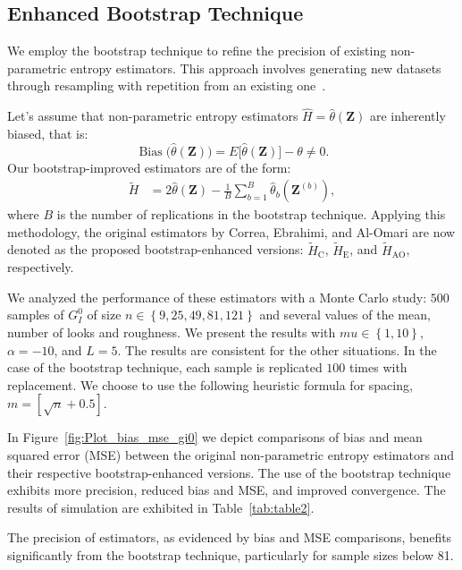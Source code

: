 \documentclass[remotesensing,article,submit,moreauthors,pdftex]{Definitions/mdpi}
\begin{document}
\hypertarget{enhanced-bootstrap-technique}{%
\subsection{Enhanced Bootstrap
Technique}\label{enhanced-bootstrap-technique}}

We employ the bootstrap technique to refine the precision of existing
non-parametric entropy estimators. This approach involves generating new
datasets through resampling with repetition from an existing
one~\cite{Michelucci2021}.

Let's assume that non-parametric entropy estimators
\(\widehat{H}=\widehat{\theta}(\bm{Z})\) are inherently biased, that is:
\begin{equation}
\label{Eq:bias1}
\operatorname{Bias}\big(\widehat{\theta}(\bm{Z})\big) = E\big[\widehat{\theta}(\bm{Z})\big] - \theta \neq 0.
\end{equation} Our bootstrap-improved estimators are of the form:
\begin{align*}
\widetilde{H} &= 2\widehat{\theta}(\bm{Z}) - \frac{1}{B}\sum_{b=1}^B \widehat{\theta}_b(\bm{Z}^{(b)}),
\end{align*} where \(B\) is the number of replications in the bootstrap
technique. Applying this methodology, the original estimators by Correa,
Ebrahimi, and Al-Omari are now denoted as the proposed
bootstrap-enhanced versions: \(\widetilde{H}_{\text{C}}\),
\(\widetilde{H}_{\text{E}}\), and \(\widetilde{H}_{\text{AO}}\),
respectively.

We analyzed the performance of these estimators with a Monte Carlo
study: \(500\) samples of \(G_I^0\) of size
\(n\in\left\{9, 25, 49, 81, 121\right\}\) and several values of the
mean, number of looks and roughness. We present the results with
\(mu\in\left\{1, 10\right\}\), \(\alpha=-10\), and \(L=5\). The results
are consistent for the other situations. In the case of the bootstrap
technique, each sample is replicated \(100\) times with replacement. We
choose to use the following heuristic formula for spacing,
\(m=\left[\sqrt{n}+0.5\right]\).

In Figure~\ref{fig:Plot_bias_mse_gi0} we depict comparisons of bias and
mean squared error (MSE) between the original non-parametric entropy
estimators and their respective bootstrap-enhanced versions. The use of
the bootstrap technique exhibits more precision, reduced bias and MSE,
and improved convergence. The results of simulation are exhibited in
Table~\ref{tab:table2}.

The precision of estimators, as evidenced by bias and MSE comparisons,
benefits significantly from the bootstrap technique, particularly for
sample sizes below 81.
\end{document}

